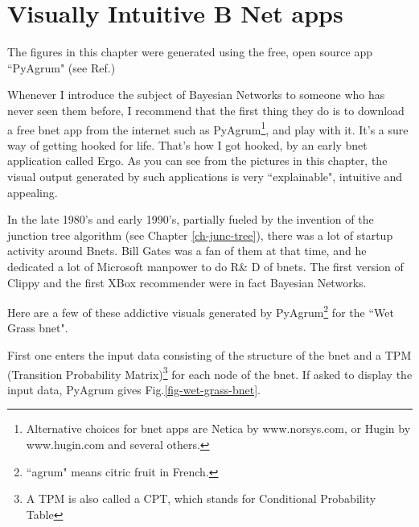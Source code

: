 \chapter{Visually Intuitive B Net apps}
\label{ch-bnet-apps}

The figures in this chapter were generated using
the free, open source app ``PyAgrum" (see Ref.\cite{pyagrum})


Whenever I introduce the subject of Bayesian Networks
to someone who has never seen them before, I recommend that the first thing they do is to
download a free bnet app from the internet such as PyAgrum\footnote{Alternative choices for bnet apps are Netica by www.norsys.com, or Hugin by www.hugin.com and several others.}, and play with it. It's a sure way of getting hooked
for life. That's how I got hooked, by an early bnet application called Ergo. As you can see from the pictures in this chapter,
the visual output generated by such applications is very ``explainable", intuitive and appealing.
  
In the late 1980's and early 1990's, partially fueled by the invention of
the junction tree algorithm (see Chapter \ref{ch-junc-tree}), there was a lot of startup activity around Bnets. Bill Gates was a fan of them at that time, and he dedicated a lot of Microsoft manpower to do R\& D of bnets. The first version of Clippy and the first XBox recommender were in fact Bayesian Networks.

Here are a few of these addictive visuals generated by PyAgrum\footnote{``agrum" means citric fruit in French. }
for the ``Wet Grass bnet".

First one enters the input data consisting of the structure of the bnet and a TPM (Transition Probability Matrix)\footnote{A TPM is also called
a CPT, which stands for Conditional Probability Table}
for each node of the bnet.
If asked to display the input data, PyAgrum gives Fig.\ref{fig-wet-grass-bnet}.

